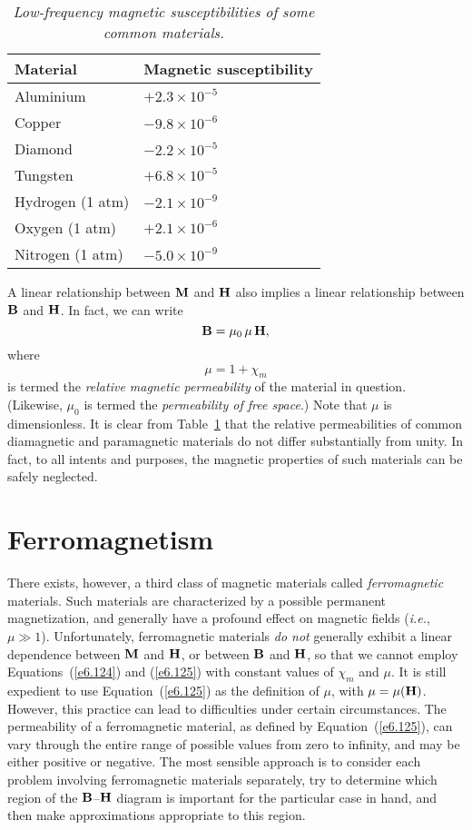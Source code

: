 \begin{table}\centering
\begin{tabular}{ll}\hline
{\bf Material} & {\bf Magnetic susceptibility}\\ \hline
Aluminium & $+2.3\times 10^{-5}$ \\ 
Copper & $-9.8\times 10^{-6}$ \\
Diamond & $-2.2\times 10^{-5}$ \\
Tungsten & $+6.8\times 10^{-5}$ \\
Hydrogen (1 atm) & $-2.1\times 10^{-9}$ \\
Oxygen (1 atm) & $+2.1\times 10^{-6}$ \\
Nitrogen (1 atm) & $-5.0\times 10^{-9}$\\ \hline
\end{tabular}
\caption{\em Low-frequency magnetic susceptibilities of some common materials.}\label{tab1}
\end{table}

A linear relationship between ${\bf M}$ and ${\bf H}$ also
implies a linear relationship between ${\bf  B}$ and ${\bf H}$.
In fact, we can write 
\begin{equation}\label{e6.125}
{\bf B} = \mu_0\,\mu\,{\bf H},
\end{equation}
where
\begin{equation}
\mu = 1+ \chi_m
\end{equation}
is termed the {\em relative magnetic permeability}\/ of the material
in question.
(Likewise,
$\mu_0$ is termed the {\em permeability of free space}.) Note that $\mu$
is dimensionless.
It is clear from
Table~\ref{tab1} that the relative permeabilities of common diamagnetic and paramagnetic
materials do not differ substantially from unity. In fact,
to all intents and purposes, the magnetic properties of such materials
can be safely neglected. 

\section{Ferromagnetism}
There exists, however, a third class of magnetic materials called
{\em ferromagnetic}\/ materials. Such materials are characterized by a
possible permanent magnetization, and generally have a profound effect
on magnetic fields ({\em i.e.}, $\mu\gg 1$). 
Unfortunately, ferromagnetic materials {\em do not}\/ generally exhibit a linear
dependence between ${\bf M}$ and ${\bf H}$, or between ${\bf B}$ and ${\bf H}$,
so that we cannot employ Equations~(\ref{e6.124}) and (\ref{e6.125}) with constant values
of $\chi_m$ and $\mu$. It is still  expedient to use  Equation~(\ref{e6.125}) as the
definition of  $\mu$, with $\mu = \mu({\bf H})$. However,
this practice can lead to difficulties under certain circumstances.
The permeability of a ferromagnetic material, as defined by
Equation~(\ref{e6.125}), can vary through the entire range of possible values
from zero to infinity, and may be either positive or negative. The most
sensible  
approach is to consider each problem involving ferromagnetic materials
separately, try to determine which region of the ${\bf B}$--${\bf H}$ diagram
is important for the particular case in hand, and then
make approximations appropriate
to this region. 



